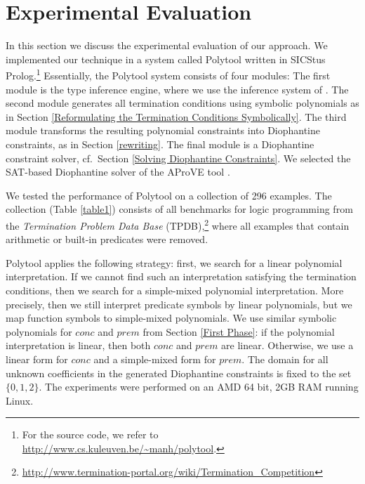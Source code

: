 \documentclass[envcountsame]{tlp}
\newcounter{ex:der-lastsymconsctr}
\begin{document}
\section{Experimental Evaluation}
\label{sec:experiment} 


In this section we discuss the experimental evaluation of our
approach. We implemented our technique in a system called \textsf{Polytool} 
\cite{Nguyen&DeSchreye06} written in \textsf{SICStus Prolog}.\footnote{For the
source code, we refer to \url{http://www.cs.kuleuven.be/~manh/polytool}.} 
Essentially, the \textsf{Polytool} system consists of four modules:
The
first module is the type inference engine,
where we use the
inference
system of 
\cite{GallagherHB05}.
The second module 
generates all termination conditions using symbolic polynomials
as in Section \ref{Reformulating 
the Termination Conditions Symbolically}. 
The third module transforms the resulting polynomial constraints 
into Diophantine constraints, as in Section
\ref{rewriting}. 
The final module is a Diophantine
constraint solver, cf.\ Section \ref{Solving Diophantine Constraints}. 
We selected the SAT-based Diophantine solver \cite{Fuhsc07} 
of the \textsf{AProVE} tool \cite{Giesletal06}.







We tested the performance of \textsf{Polytool} on 
a collection of 296 examples. The collection (Table
\ref{table1}) consists of all
benchmarks for logic programming from the \emph{Termination Problem
Data Base} (TPDB),\footnote{\url{http://www.termination-portal.org/wiki/Termination_Competition}}
where all examples that contain arithmetic or
built-in predicates were removed.  




{\sf Polytool} applies the following strategy:
first, we search for a linear polynomial interpretation. If
we cannot find such an interpretation satisfying the termination conditions,
then we 
search for a simple-mixed polynomial interpretation. More precisely, then we
still interpret predicate symbols by linear polynomials, but we map function
symbols to simple-mixed polynomials.
We use
  similar symbolic polynomials for 
$\mathit{conc}$ and $\mathit{prem}$ from
Section \ref{First Phase}: if the polynomial interpretation is linear, 
  then both $\mathit{conc}$ and $\mathit{prem}$ are linear. Otherwise, we use a linear
form for $\mathit{conc}$ and a simple-mixed form for $\mathit{prem}$. 
The domain for all
unknown coefficients in the generated Diophantine constraints is fixed to the set
$\{0,1,2\}$.
The experiments were performed 
on an AMD 64 bit, 2GB RAM running Linux.
\end{document}
